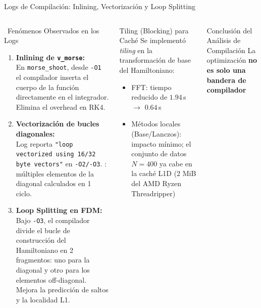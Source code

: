 \documentclass[aspectratio=169,10pt]{beamer}
\begin{document}
\begin{frame}[allowframebreaks]{Logs de Compilación: Inlining, Vectorización y Loop Splitting}
\begin{columns}[T]
\begin{block}{\faSearch\ Fenómenos Observados en los Logs}
\begin{enumerate}\setlength\itemsep{4pt}
  \item \textbf{Inlining de \texttt{v\_morse}:}\\
  En \texttt{morse\_shoot}, desde \texttt{-O1} el compilador inserta el cuerpo de la función directamente en el integrador. Elimina el overhead en RK4.

  \item \textbf{Vectorización de bucles diagonales:}\\
  Log reporta \texttt{"loop vectorized using 16/32 byte vectors"} en \texttt{-O2/-O3}. : múltiples elementos de la diagonal calculados en 1 ciclo.

  \item \textbf{Loop Splitting en FDM:}\\
  Bajo \texttt{-O3}, el compilador divide el bucle de construcción del Hamiltoniano en 2 fragmentos: uno para la diagonal y otro para los elementos off-diagonal. Mejora la predicción de saltos y la localidad L1.
\end{enumerate}
\end{block}

\begin{alertbox}{Tiling (Blocking) para Caché}
Se implementó \textit{tiling} en la transformación de base del Hamiltoniano:
\begin{itemize}
  \item FFT: tiempo reducido de $1.94\,$s $\to$ $0.64\,$s
  \item Métodos locales (Base/Lanczos): impacto mínimo; el conjunto de datos $N=400$ ya cabe en la caché L1D (2 MiB del AMD Ryzen Threadripper)
\end{itemize}
\end{alertbox}
\vspace{0.025cm}
\begin{conclusionbox}{Conclusión del Análisis de Compilación}
La optimización \textbf{no es solo una bandera de compilador}
\end{conclusionbox}
\end{columns}
\end{frame}
\end{document}
